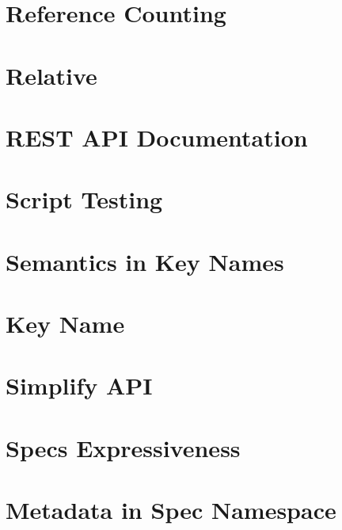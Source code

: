 \let\mypdfximage\pdfximage\def\pdfximage{\immediate\mypdfximage}\documentclass[twoside]{book}
\newcommand{\+}{\discretionary{\mbox{\scriptsize$\hookleftarrow$}}{}{}}
\begin{document}
\chapter{Reference Counting}
\label{doc_decisions_reference_counting_md}

\chapter{Relative}
\label{doc_decisions_relative_md}

\chapter{REST API Documentation}
\label{doc_decisions_rest_api_documentation_md}

\chapter{Script Testing}
\label{doc_decisions_script_testing_md}

\chapter{Semantics in Key Names}
\label{doc_decisions_semantics_name_md}

\chapter{Key Name}
\label{doc_decisions_separate_key_name_md}

\chapter{Simplify API}
\label{doc_decisions_simplify_api_md}

\chapter{Spec\textquotesingle{}s Expressiveness}
\label{doc_decisions_spec_expressiveness_md}

\chapter{Metadata in Spec Namespace}
\label{doc_decisions_spec_metadata_md}

\end{document}
